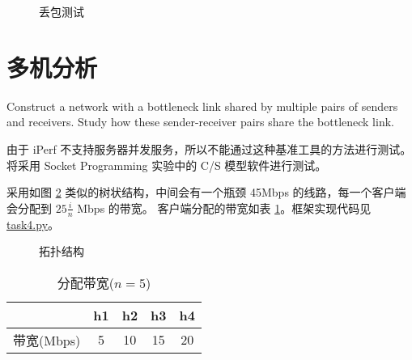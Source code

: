    \begin{figure}[H]
       \centering
       \caption{丢包测试}\label{fig:loss}
   \end{figure}

    \section{多机分析}

    Construct a network with a bottleneck link shared by multiple pairs of senders and receivers. Study how these sender-receiver pairs share the bottleneck link.

    由于 iPerf 不支持服务器并发服务，所以不能通过这种基准工具的方法进行测试。将采用 Socket Programming 实验中的 C/S 模型软件进行测试。

    采用如图 \ref{fig:task4topo} 类似的树状结构，中间会有一个瓶颈 45Mbps 的线路，每一个客户端会分配到 $25\frac{i}{n}$ Mbps 的带宽。
    客户端分配的带宽如表 \ref{tab:bandwidth}。框架实现代码见 \href{./task4.py}{\ttfamily task4.py}。

    \noindent
    \begin{minipage}{0.5\textwidth}
        \begin{figure}[H]
            \centering
            
            \caption{拓扑结构}\label{fig:task4topo}
        \end{figure}
    \end{minipage}
    \begin{minipage}{0.5\textwidth}
        \begin{table}[H]
        \centering
        \caption{分配带宽($n=5$)}\label{tab:bandwidth}
        \begin{tabular}{ccccc}
            \toprule
                & h1 & h2 & h3 & h4\\
            \midrule
            带宽(Mbps) & 5 & 10 & 15 & 20 \\
            \bottomrule
        \end{tabular}
    \end{table}
    \end{minipage}
    \vspace*{5pt}
    

